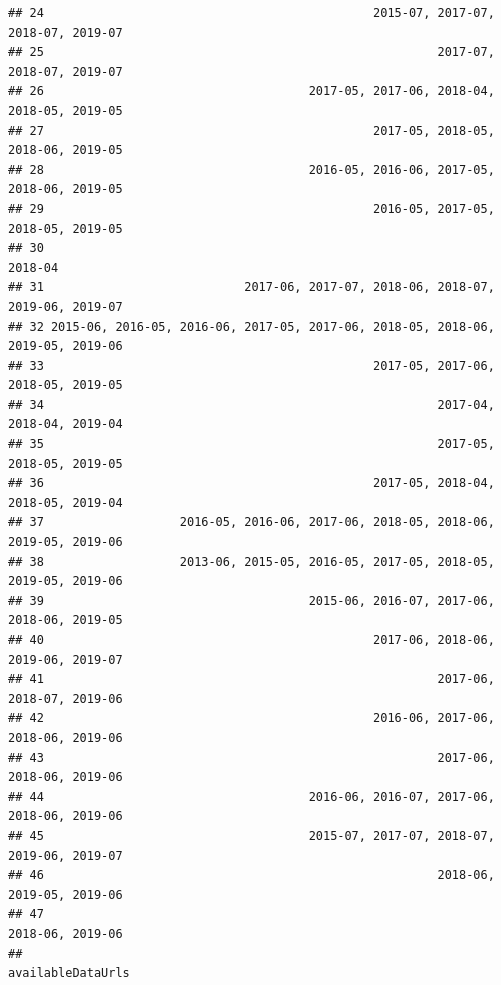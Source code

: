 \documentclass[]{book}
\begin{document}
\begin{verbatim}
## 24                                              2015-07, 2017-07, 2018-07, 2019-07
## 25                                                       2017-07, 2018-07, 2019-07
## 26                                     2017-05, 2017-06, 2018-04, 2018-05, 2019-05
## 27                                              2017-05, 2018-05, 2018-06, 2019-05
## 28                                     2016-05, 2016-06, 2017-05, 2018-06, 2019-05
## 29                                              2016-05, 2017-05, 2018-05, 2019-05
## 30                                                                         2018-04
## 31                            2017-06, 2017-07, 2018-06, 2018-07, 2019-06, 2019-07
## 32 2015-06, 2016-05, 2016-06, 2017-05, 2017-06, 2018-05, 2018-06, 2019-05, 2019-06
## 33                                              2017-05, 2017-06, 2018-05, 2019-05
## 34                                                       2017-04, 2018-04, 2019-04
## 35                                                       2017-05, 2018-05, 2019-05
## 36                                              2017-05, 2018-04, 2018-05, 2019-04
## 37                   2016-05, 2016-06, 2017-06, 2018-05, 2018-06, 2019-05, 2019-06
## 38                   2013-06, 2015-05, 2016-05, 2017-05, 2018-05, 2019-05, 2019-06
## 39                                     2015-06, 2016-07, 2017-06, 2018-06, 2019-05
## 40                                              2017-06, 2018-06, 2019-06, 2019-07
## 41                                                       2017-06, 2018-07, 2019-06
## 42                                              2016-06, 2017-06, 2018-06, 2019-06
## 43                                                       2017-06, 2018-06, 2019-06
## 44                                     2016-06, 2016-07, 2017-06, 2018-06, 2019-06
## 45                                     2015-07, 2017-07, 2018-07, 2019-06, 2019-07
## 46                                                       2018-06, 2019-05, 2019-06
## 47                                                                2018-06, 2019-06
##                                                                                                                                                                                                                                                                                                                                                                                                                                                                                                                                                                                                                              availableDataUrls

\end{verbatim}
\end{document}
